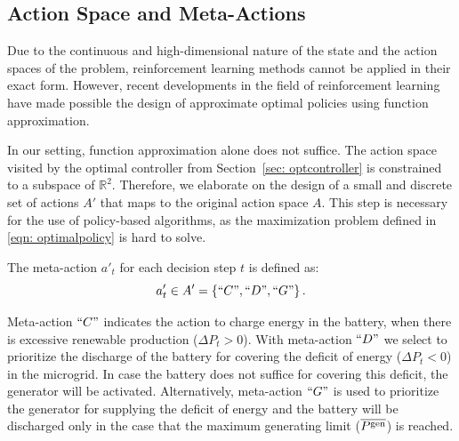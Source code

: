 \documentclass{article}
\begin{document}
	\subsection{Action Space and Meta-Actions}
	
%
%

	Due to the continuous and high-dimensional nature of the state and the action spaces of the problem, reinforcement learning methods cannot be applied in their exact form. However, recent developments in the field of reinforcement learning have made possible the design of approximate optimal policies using function approximation.

	In our setting, function approximation alone does not suffice. The action space visited by the optimal controller from Section~\ref{sec: optcontroller} is constrained to a subspace of $\mathbb{R}^2$. Therefore, we elaborate on the design of a small and discrete set of actions $A'$ that maps to the original action space $A$.  This step is necessary for the use of policy-based algorithms, as the maximization problem defined in \eqref{eqn: optimalpolicy} is hard to solve.
	
	The meta-action $a'_{t}$ for each decision step $t$ is defined as: $$a'_{t} \in A'= \left\lbrace ``C",``D", ``G" \right\rbrace.$$ 
	
	Meta-action $``C"$ indicates the action to charge energy in the battery, when there is excessive renewable production ($\Delta P_t > 0 $). With meta-action $``D"$ we select to prioritize the discharge of the battery for covering the deficit of energy ($\Delta P_t < 0 $) in the microgrid. In case the battery does not suffice for covering this deficit, the generator will be activated. Alternatively, meta-action $``G"$ is used to prioritize the generator for supplying the deficit of energy and the battery will be discharged only in the case that the maximum generating limit ($\overline{P^\text{gen}}$) is reached.
	
\end{document}
